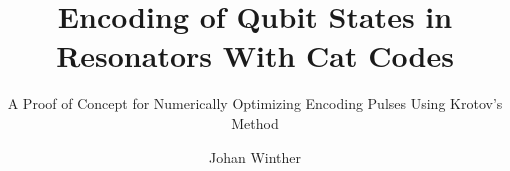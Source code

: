 \documentclass[masters,a4paper]{chalmers-thesis}
\title{Encoding of Qubit States in Resonators With Cat Codes}
\subtitle{A Proof of Concept for Numerically Optimizing Encoding Pulses Using Krotov's Method} %
\author{Johan Winther}
\begin{document}
\maketitle

%

%
\clearpage{}

\clearpage{}

\clearpage{}

\clearpage{}


\clearpage{}
\printbibliography{} %

\clearpage{}
\appendix

\end{document}
